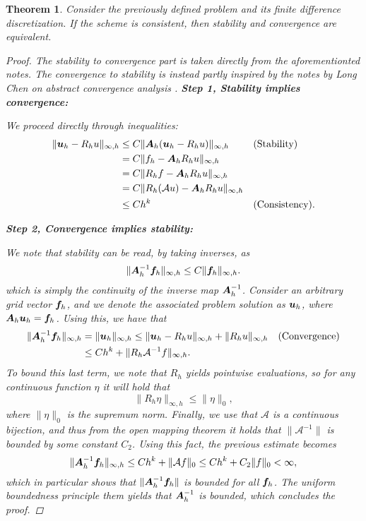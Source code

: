 \documentclass{article}
\renewcommand{\vec}{\vectorsym}
\newcommand{\mat}{\matrixsym}
\newtheorem{theorem}{Theorem}
\begin{document}
\begin{theorem}
    Consider the previously defined problem and its finite difference discretization. If the scheme is consistent, then stability and convergence are equivalent. 
    \begin{proof}
        The stability to convergence part is taken directly from the aforementionted notes. The convergence to stability is instead partly inspired by the notes by Long Chen on abstract convergence analysis \cite{chen2009unified}. 
        {\bf Step 1, Stability implies convergence:}

        We proceed directly through inequalities:
        \begin{align*}
            \| \vec u_h - R_h u\|_{\infty,h} &\leq C\|\mat A_h(\vec u_h - R_hu) \|_{\infty,h} && \text{(Stability)} \\
                                             &=C \| f_h - \mat A_hR_h u \|_{\infty,h} && \\
                                             &=C \| R_h f - \mat A_hR_h u\|_{\infty,h} &&\\
                                             &=C \|R_h(\mathcal A u) - \mat A_hR_h u\|_{\infty,h}&& \\
                                             &\leq Ch^k && \text{(Consistency)}.
        \end{align*}

        {\bf Step 2, Convergence implies stability:}

        We note that stability can be read, by taking inverses, as 
        $$ \| \mat A_h^{-1}\vec f_h \|_{\infty, h} \leq C \|\vec f_h\|_{\infty, h}. $$
        which is simply the continuity of the inverse map $\mat A_h^{-1}$. Consider an arbitrary grid vector $\vec f_h$, and we denote the associated problem solution as $\vec u_h$, where $\mat A_h \vec u_h = \vec f_h$. Using this, we have that
        $$ 
        \begin{aligned} 
            \|\mat A_h^{-1}\vec f_h\|_{\infty,h} &= \| \vec u_h \|_{\infty, h} \leq \| \vec u_h - R_h u \|_{\infty, h} + \| R_h u \|_{\infty, h} && \text{(Convergence)}\\
                                                 &\leq C h^k + \| R_h \mathcal A^{-1} f \|_{\infty, h}. 
        \end{aligned}
        $$
        To bound this last term, we note that $R_h$ yields pointwise evaluations, so for any continuous function $\eta$ it will hold that
        $$ \| R_h \eta \|_{\infty,h} \leq \| \eta \|_0, $$
        where $\| \eta \|_0$ is the supremum norm. Finally, we use that $\mathcal A$ is a continuous bijection, and thus from the open mapping theorem it holds that $\|\mathcal A^{-1}\|$ is bounded by some constant $C_2$. Using this fact, the previous estimate becomes 
        $$ \| \mat A_h^{-1} \vec f_h \|_{\infty,h} \leq Ch^k + \| \mathcal A f \|_0 \leq C h^k + C_2 \| f \|_0<\infty, $$
        which in particular shows that $ \| \mat A_h^{-1} \vec f_h \|$ is bounded for all $\vec f_h$. The uniform boundedness principle them yields that $\mat A_h^{-1}$ is bounded, which concludes the proof.
    \end{proof}
\end{theorem}
\end{document}
